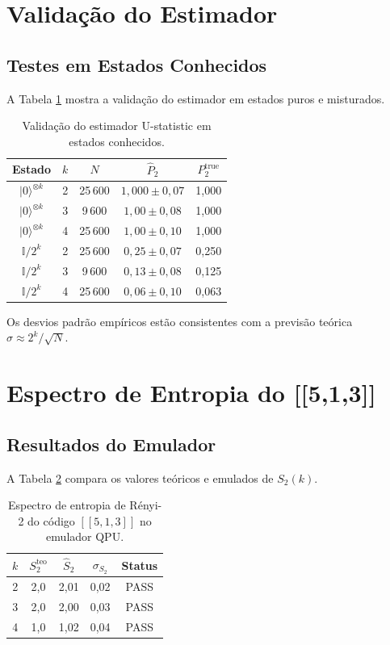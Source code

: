 \documentclass[12pt,a4paper,oneside]{book}
\theoremstyle{definition}
\theoremstyle{remark}
\begin{document}
\section{Validação do Estimador}

\subsection{Testes em Estados Conhecidos}

A Tabela \ref{tab:estimator_validation} mostra a validação do estimador em estados puros e misturados.

\begin{table}[H]
\centering
\caption{Validação do estimador U-statistic em estados conhecidos.}\label{tab:estimator_validation}
\begin{tabular}{c|c|c|c|c}
\toprule
Estado & $k$ & $N$ & $\widehat{P}_2$ & $P_2^{\text{true}}$ \\
\midrule
$|0\rangle^{\otimes k}$ & 2 & 25\,600 & $1{,}000 \pm 0{,}07$ & 1{,}000 \\
$|0\rangle^{\otimes k}$ & 3 & 9\,600 & $1{,}00 \pm 0{,}08$ & 1{,}000 \\
$|0\rangle^{\otimes k}$ & 4 & 25\,600 & $1{,}00 \pm 0{,}10$ & 1{,}000 \\
$\mathbb{I}/2^k$ & 2 & 25\,600 & $0{,}25 \pm 0{,}07$ & 0{,}250 \\
$\mathbb{I}/2^k$ & 3 & 9\,600 & $0{,}13 \pm 0{,}08$ & 0{,}125 \\
$\mathbb{I}/2^k$ & 4 & 25\,600 & $0{,}06 \pm 0{,}10$ & 0{,}063 \\
\bottomrule
\end{tabular}
\end{table}

Os desvios padrão empíricos estão consistentes com a previsão teórica $\sigma \approx 2^k/\sqrt{N}$.

\section{Espectro de Entropia do [[5,1,3]]}

\subsection{Resultados do Emulador}

A Tabela \ref{tab:spectrum} compara os valores teóricos e emulados de $S_2(k)$.

\begin{table}[H]
\centering
\caption{Espectro de entropia de Rényi-2 do código $[[5,1,3]]$ no emulador QPU.}\label{tab:spectrum}
\begin{tabular}{c|c|c|c|c}
\toprule
$k$ & $S_2^{\text{teo}}$ & $\widehat{S}_2$ & $\sigma_{S_2}$ & Status \\
\midrule
2 & 2{,}0 & 2{,}01 & 0{,}02 & PASS \\
3 & 2{,}0 & 2{,}00 & 0{,}03 & PASS \\
4 & 1{,}0 & 1{,}02 & 0{,}04 & PASS \\
\bottomrule
\end{tabular}
\end{table}
\end{document}
